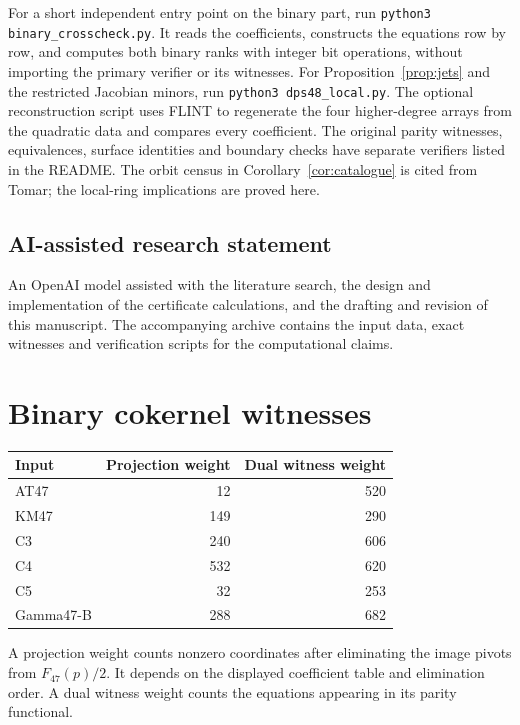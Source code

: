 \documentclass[11pt,reqno]{amsart}
\begin{document}
For a short independent entry point on the binary part, run \texttt{python3 binary\_crosscheck.py}. It reads the coefficients, constructs the equations row by row, and computes both binary ranks with integer bit operations, without importing the primary verifier or its witnesses. For Proposition~\ref{prop:jets} and the restricted Jacobian minors, run \texttt{python3 dps48\_local.py}. The optional reconstruction script uses FLINT to regenerate the four higher-degree arrays from the quadratic data and compares every coefficient. The original parity witnesses, equivalences, surface identities and boundary checks have separate verifiers listed in the README. The orbit census in Corollary~\ref{cor:catalogue} is cited from Tomar; the local-ring implications are proved here.

\subsection*{AI-assisted research statement}
An OpenAI model assisted with the literature search, the design and implementation of the certificate calculations, and the drafting and revision of this manuscript. The accompanying archive contains the input data, exact witnesses and verification scripts for the computational claims.

\appendix
\section{Binary cokernel witnesses}
\begin{center}
\begin{tabular}{@{}lrr@{}}
\toprule
Input & Projection weight & Dual witness weight\\
\midrule
AT47 &12&520\\
KM47 &149&290\\
C3 &240&606\\
C4 &532&620\\
C5 &32&253\\
Gamma47-B &288&682\\
\bottomrule
\end{tabular}
\end{center}
A projection weight counts nonzero coordinates after eliminating the image pivots from \(F_{47}(p)/2\). It depends on the displayed coefficient table and elimination order. A dual witness weight counts the equations appearing in its parity functional.
\end{document}
